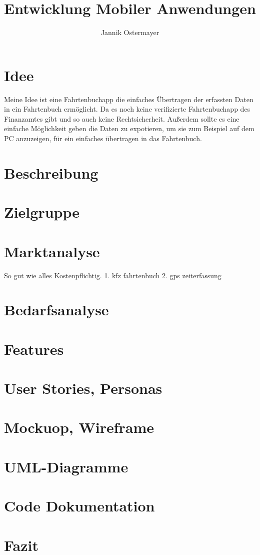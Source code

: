 \documentclass{article}
\title{Entwicklung Mobiler Anwendungen}
\author{Jannik Ostermayer}
\begin{document}
\maketitle

\section{Idee}
Meine Idee ist eine Fahrtenbuchapp die einfaches Übertragen der erfassten Daten in ein Fahrtenbuch ermöglicht.
Da es noch keine verifizierte Fahrtenbuchapp des Finanzamtes gibt und so auch keine Rechtsicherheit.
Außerdem sollte es eine einfache Möglichkeit geben die Daten zu expotieren, um sie zum Beispiel auf dem
PC anzuzeigen, für ein einfaches übertragen in das Fahrtenbuch.

\section{Beschreibung}

\section{Zielgruppe}

\section{Marktanalyse}
So gut wie alles Kostenpflichtig.
1. kfz fahrtenbuch
2. gps zeiterfassung

\section{Bedarfsanalyse}

\section{Features}

\section{User Stories, Personas}

\section{Mockuop, Wireframe}

\section{UML-Diagramme}

\section{Code Dokumentation}

\section{Fazit}
\end{document}
